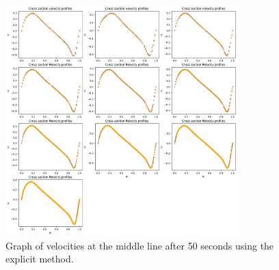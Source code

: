 \documentclass{article}
\begin{document}
\begin{figure}[h!] 
    \centering 
    \includegraphics[width=0.8\textwidth]{lidDrivenACM_cross.png} 
    \caption{Graph of velocities at the middle line after 50 seconds using the explicit method.} 
    \label{fig:lidDrivenACM_cross} 
\end{figure}
\end{document}
